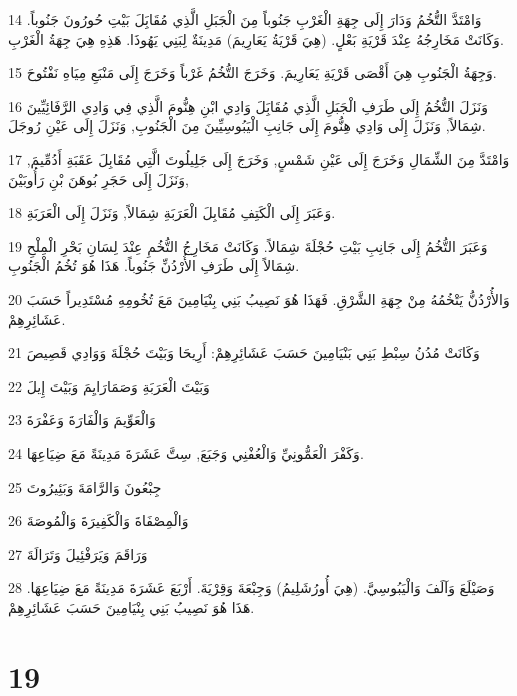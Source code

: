 \par 14 وَامْتَدَّ التُّخُمُ وَدَارَ إِلَى جِهَةِ الْغَرْبِ جَنُوباً مِنَ الْجَبَلِ الَّذِي مُقَابَِلَ بَيْتِ حُورُونَ جَنُوباً. وَكَانَتْ مَخَارِجُهُ عِنْدَ قَرْيَةِ بَعْلٍ. (هِيَ قَرْيَةُ يَعَارِيمَ) مَدِينَةٌ لِبَنِي يَهُوذَا. هَذِهِ هِيَ جِهَةُ الْغَرْبِ.
\par 15 وَجِهَةُ الْجَنُوبِ هِيَ أَقْصَى قَرْيَةِ يَعَارِيمَ. وَخَرَجَ التُّخُمُ غَرْباً وَخَرَجَ إِلَى مَنْبَعِ مِيَاهِ نَفْتُوحَ.
\par 16 وَنَزَلَ التُّخُمُ إِلَى طَرَفِ الْجَبَلِ الَّذِي مُقَابَِلَ وَادِي ابْنِ هِنُّومَ الَّذِي فِي وَادِي الرَّفَائِيِّينَ شِمَالاً, وَنَزَلَ إِلَى وَادِي هِنُّومَ إِلَى جَانِبِ الْيَبُوسِيِّينَ مِنَ الْجَنُوبِ, وَنَزَلَ إِلَى عَيْنِ رُوجَلَ.
\par 17 وَامْتَدَّ مِنَ الشِّمَالِ وَخَرَجَ إِلَى عَيْنِ شَمْسٍ, وَخَرَجَ إِلَى جَلِيلُوتَ الَّتِي مُقَابِلَ عَقَبَةِ أَدُمِّيمَ, وَنَزَلَ إِلَى حَجَرِ بُوهَنَ بْنِ رَأُوبَيْنَ,
\par 18 وَعَبَرَ إِلَى الْكَتِفِ مُقَابِلَ الْعَرَبَةِ شِمَالاً, وَنَزَلَ إِلَى الْعَرَبَةِ.
\par 19 وَعَبَرَ التُّخُمُ إِلَى جَانِبِ بَيْتِ حُجْلَةَ شِمَالاً. وَكَانَتْ مَخَارِجُ التُّخُمِ عِنْدَ لِسَانِ بَحْرِ الْمِلْحِ شِمَالاً إِلَى طَرَفِ الأُرْدُنِّ جَنُوباً. هَذَا هُوَ تُخُمُ الْجَنُوبِ.
\par 20 وَالأُرْدُنُّ يَتْخُمُهُ مِنْ جِهَةِ الشَّرْقِ. فَهَذَا هُوَ نَصِيبُ بَنِي بِنْيَامِينَ مَعَ تُخُومِهِ مُسْتَدِيراً حَسَبَ عَشَائِرِهِمْ.
\par 21 وَكَانَتْ مُدُنُ سِبْطِ بَنِي بَنْيَامِينَ حَسَبَ عَشَائِرِهِمْ: أَرِيحَا وَبَيْتَ حُجْلَةَ وَوَادِي قَصِيصَ
\par 22 وَبَيْتَ الْعَرَبَةِ وَصَمَارَايِمَ وَبَيْتَ إِيلَ
\par 23 وَالْعَوِّيمَ وَالْفَارَةَ وَعَفْرَةَ
\par 24 وَكَفْرَ الْعَمُّونِيِّ وَالْعُفْنِي وَجَبَعَ, سِتَّ عَشَرَةَ مَدِينَةً مَعَ ضِيَاعِهَا.
\par 25 جِبْعُونَ وَالرَّامَةَ وَبَئِيرُوتَ
\par 26 وَالْمِصْفَاةَ وَالْكَفِيرَةَ وَالْمُوصَةَ
\par 27 وَرَاقَمَ وَيَرَفْئِيلَ وَتَرَالَةَ
\par 28 وَصَيْلَعَ وَآلَفَ وَالْيَبُوسِيَّ. (هِيَ أُورُشَلِيمُ) وَجِبْعَةَ وَقِرْيَةَ. أَرْبَعَ عَشَرَةَ مَدِينَةً مَعَ ضِيَاعِهَا. هَذَا هُوَ نَصِيبُ بَنِي بِنْيَامِينَ حَسَبَ عَشَائِرِهِمْ.

\chapter{19}

